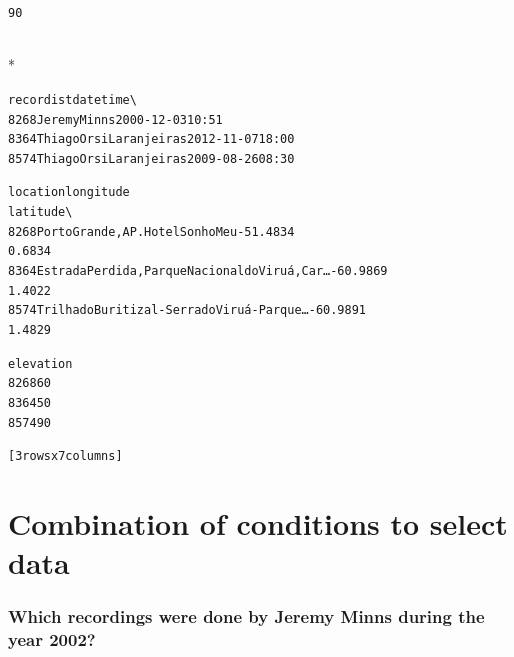 \documentclass[letterpaper,10pt,english]{/usr/share/sphinx/texinputs/sphinxhowto}
\def\smaller{\fontsize{9.5pt}{9.5pt}\selectfont}
\newenvironment{InvisibleVerbatim}
        {\begin{mdframed}[leftmargin=0.1\linewidth,innerleftmargin=3pt,innerrightmargin=3pt, userdefinedwidth=1\linewidth, linewidth=0pt, linecolor=white, usetwoside=false]}
        {\end{mdframed}}
\begin{document}
    

        
        

            
                \begin{InvisibleVerbatim}
                \vspace{-0.5\baselineskip}
\begin{alltt}90
\end{alltt}

            \end{InvisibleVerbatim}
            
                \makebox[0.1\linewidth]{\smaller\hfill\tt\color{nbframe-out-prompt}Out\hspace{4pt}{[}30{]}:\hspace{4pt}}\\*
                \vspace{-2.55\baselineskip}\begin{InvisibleVerbatim}
                \vspace{-0.5\baselineskip}
\begin{alltt}                    recordist        date   time  \textbackslash{}
8268             Jeremy Minns  2000-12-03  10:51
8364  Thiago Orsi Laranjeiras  2012-11-07  18:00
8574  Thiago Orsi Laranjeiras  2009-08-26  08:30

                                               location  longitude
latitude  \textbackslash{}
8268                  Porto Grande, AP. Hotel Sonho Meu   -51.4834
0.6834
8364  Estrada Perdida, Parque Nacional do Viruá, Car\ldots   -60.9869
1.4022
8574  Trilha do Buritizal - Serra do Viruá - Parque \ldots   -60.9891
1.4829

     elevation
8268        60
8364        50
8574        90

[3 rows x 7 columns]\end{alltt}

            \end{InvisibleVerbatim}
            
        
    
\section{Combination of conditions to select data}\subsubsection{Which recordings were done by Jeremy Minns during the year 2002?}
\end{document}
